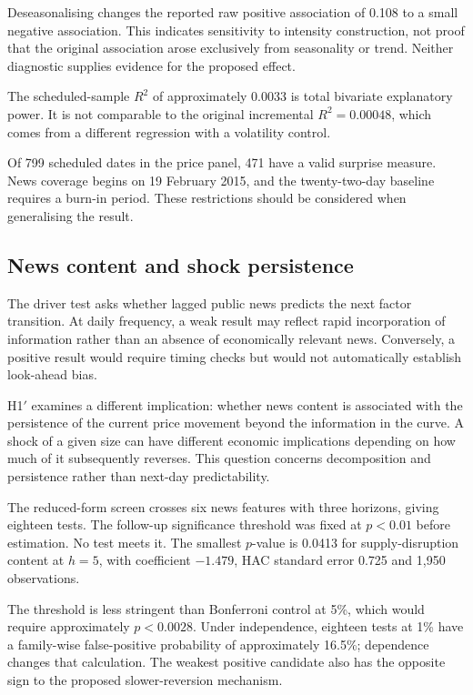 \documentclass[journal]{IEEEtran}
\begin{document}
Deseasonalising changes the reported raw positive association of 0.108 to a small negative association. This indicates sensitivity to intensity construction, not proof that the original association arose exclusively from seasonality or trend. Neither diagnostic supplies evidence for the proposed effect.

The scheduled-sample $R^2$ of approximately 0.0033 is total bivariate explanatory power. It is not comparable to the original incremental $R^2=0.00048$, which comes from a different regression with a volatility control.

Of 799 scheduled dates in the price panel, 471 have a valid surprise measure. News coverage begins on 19 February 2015, and the twenty-two-day baseline requires a burn-in period. These restrictions should be considered when generalising the result.

\subsection{News content and shock persistence}
\label{sec:h1prime}

The driver test asks whether lagged public news predicts the next factor transition. At daily frequency, a weak result may reflect rapid incorporation of information rather than an absence of economically relevant news. Conversely, a positive result would require timing checks but would not automatically establish look-ahead bias.

H1$'$ examines a different implication: whether news content is associated with the persistence of the current price movement beyond the information in the curve. A shock of a given size can have different economic implications depending on how much of it subsequently reverses. This question concerns decomposition and persistence rather than next-day predictability.

The reduced-form screen crosses six news features with three horizons, giving eighteen tests. The follow-up significance threshold was fixed at $p<0.01$ before estimation. No test meets it. The smallest $p$-value is 0.0413 for supply-disruption content at $h=5$, with coefficient $-1.479$, HAC standard error 0.725 and 1{,}950 observations.

The threshold is less stringent than Bonferroni control at 5\%, which would require approximately $p<0.0028$. Under independence, eighteen tests at 1\% have a family-wise false-positive probability of approximately 16.5\%; dependence changes that calculation. The weakest positive candidate also has the opposite sign to the proposed slower-reversion mechanism.
\end{document}
